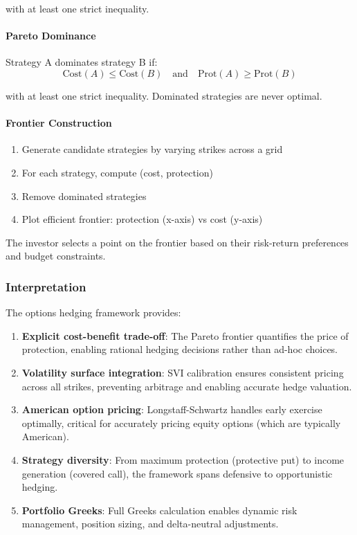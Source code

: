 with at least one strict inequality.

\paragraph{Pareto Dominance}

Strategy A dominates strategy B if:
\[
\text{Cost}(A) \leq \text{Cost}(B) \quad \text{and} \quad \text{Prot}(A) \geq \text{Prot}(B)
\]

with at least one strict inequality. Dominated strategies are never optimal.

\paragraph{Frontier Construction}

\begin{enumerate}
  \item Generate candidate strategies by varying strikes across a grid
  \item For each strategy, compute (cost, protection)
  \item Remove dominated strategies
  \item Plot efficient frontier: protection (x-axis) vs cost (y-axis)
\end{enumerate}

The investor selects a point on the frontier based on their risk-return preferences and budget constraints.

\subsubsection{Interpretation}

The options hedging framework provides:

\begin{enumerate}
  \item \textbf{Explicit cost-benefit trade-off}: The Pareto frontier quantifies the price of protection, enabling rational hedging decisions rather than ad-hoc choices.

  \item \textbf{Volatility surface integration}: SVI calibration ensures consistent pricing across all strikes, preventing arbitrage and enabling accurate hedge valuation.

  \item \textbf{American option pricing}: Longstaff-Schwartz handles early exercise optimally, critical for accurately pricing equity options (which are typically American).

  \item \textbf{Strategy diversity}: From maximum protection (protective put) to income generation (covered call), the framework spans defensive to opportunistic hedging.

  \item \textbf{Portfolio Greeks}: Full Greeks calculation enables dynamic risk management, position sizing, and delta-neutral adjustments.
\end{enumerate}

